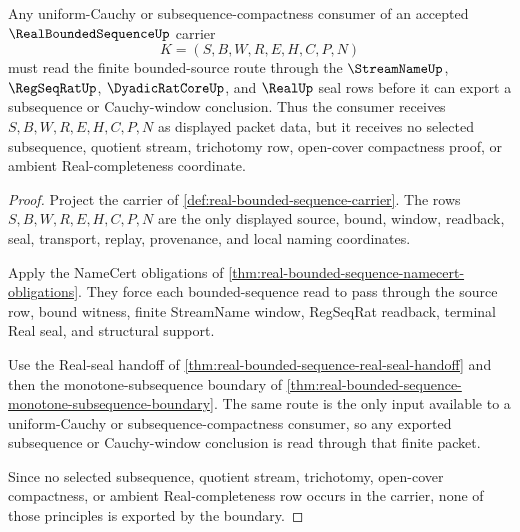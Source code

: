 \begin{theorem}
\label{thm:real-bounded-sequence-uniform-cauchy-subsequence}
Any uniform-Cauchy or subsequence-compactness consumer of an accepted $\RealBoundedSequenceUp$ carrier
$$
K=(S,B,W,R,E,H,C,P,N)
$$
must read the finite bounded-source route through the $\StreamNameUp$, $\RegSeqRatUp$, $\DyadicRatCoreUp$, and $\RealUp$ seal rows before it can export a subsequence or Cauchy-window conclusion. Thus the consumer receives $S,B,W,R,E,H,C,P,N$ as displayed packet data, but it receives no selected subsequence, quotient stream, trichotomy row, open-cover compactness proof, or ambient Real-completeness coordinate.
\end{theorem}
\begin{proof}
Project the carrier of \autoref{def:real-bounded-sequence-carrier}. The rows $S,B,W,R,E,H,C,P,N$ are the only displayed source, bound, window, readback, seal, transport, replay, provenance, and local naming coordinates.

Apply the NameCert obligations of \autoref{thm:real-bounded-sequence-namecert-obligations}. They force each bounded-sequence read to pass through the source row, bound witness, finite StreamName window, RegSeqRat readback, terminal Real seal, and structural support.

Use the Real-seal handoff of \autoref{thm:real-bounded-sequence-real-seal-handoff} and then the monotone-subsequence boundary of \autoref{thm:real-bounded-sequence-monotone-subsequence-boundary}. The same route is the only input available to a uniform-Cauchy or subsequence-compactness consumer, so any exported subsequence or Cauchy-window conclusion is read through that finite packet.

Since no selected subsequence, quotient stream, trichotomy, open-cover compactness, or ambient Real-completeness row occurs in the carrier, none of those principles is exported by the boundary.
\end{proof}

